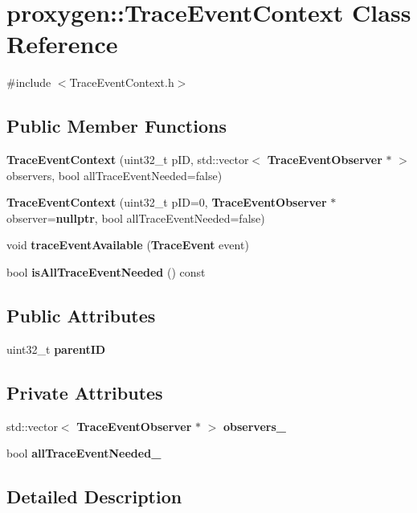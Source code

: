 \section{proxygen\+:\+:Trace\+Event\+Context Class Reference}
\label{classproxygen_1_1TraceEventContext}


{\ttfamily \#include $<$Trace\+Event\+Context.\+h$>$}

\subsection*{Public Member Functions}
\begin{DoxyCompactItemize}
\item 
{\bf Trace\+Event\+Context} (uint32\+\_\+t p\+ID, std\+::vector$<$ {\bf Trace\+Event\+Observer} $\ast$ $>$ observers, bool all\+Trace\+Event\+Needed=false)
\item 
{\bf Trace\+Event\+Context} (uint32\+\_\+t p\+ID=0, {\bf Trace\+Event\+Observer} $\ast$observer={\bf nullptr}, bool all\+Trace\+Event\+Needed=false)
\item 
void {\bf trace\+Event\+Available} ({\bf Trace\+Event} event)
\item 
bool {\bf is\+All\+Trace\+Event\+Needed} () const 
\end{DoxyCompactItemize}
\subsection*{Public Attributes}
\begin{DoxyCompactItemize}
\item 
uint32\+\_\+t {\bf parent\+ID}
\end{DoxyCompactItemize}
\subsection*{Private Attributes}
\begin{DoxyCompactItemize}
\item 
std\+::vector$<$ {\bf Trace\+Event\+Observer} $\ast$ $>$ {\bf observers\+\_\+}
\item 
bool {\bf all\+Trace\+Event\+Needed\+\_\+}
\end{DoxyCompactItemize}


\subsection{Detailed Description}


